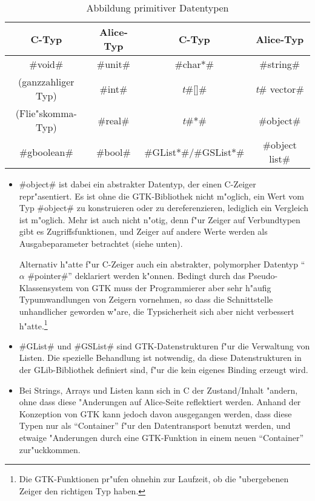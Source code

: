 \documentclass[a4paper,titlepage]{article}
\begin{document}
\begin{table}
\begin{center}
  \begin{tabular}{|c|c||c|c|}
  \hline \textbf{C-Typ}     & \textbf{Alice-Typ} &
         \textbf{C-Typ}     & \textbf{Alice-Typ}\\
  \hline #void#             & #unit# & #char*#            & #string#     \\
  \hline (ganzzahliger Typ) & #int#  & \emph{t}#[]#       & \emph{t}# vector#\\
  \hline (Flie"skomma-Typ)  & #real# & \emph{t}#*#        & #object# \\
  \hline #gboolean#         & #bool# & #GList*#/#GSList*# & #object list# \\
  \hline
  \end{tabular}
\end{center}
\caption{Abbildung primitiver Datentypen}
\label{PrimTab}
\end{table}

\begin{itemize}
\item
#object# ist dabei ein abstrakter Datentyp, der einen C-Zeiger repr"asentiert.
Es ist ohne die GTK-Bibliothek nicht m"oglich, ein Wert vom Typ #object# zu
konstruieren oder zu dereferenzieren, lediglich ein Vergleich ist m"oglich.
Mehr ist auch nicht n"otig, denn f"ur Zeiger auf Verbundtypen gibt es
Zugriffsfunktionen, und Zeiger auf andere Werte werden als Ausgabeparameter
betrachtet (siehe unten).

Alternativ h"atte f"ur C-Zeiger auch ein abstrakter, polymorpher Datentyp
``$\alpha$ #pointer#'' deklariert werden k"onnen. Bedingt durch das 
Pseudo-Klassensystem von GTK muss der Programmierer aber sehr h"aufig
Typumwandlungen von Zeigern vornehmen, so dass die Schnittstelle unhandlicher
geworden w"are, die Typsicherheit sich aber nicht verbessert 
h"atte.\footnote{Die
GTK-Funktionen pr"ufen ohnehin zur Laufzeit, ob die "ubergebenen
Zeiger den richtigen Typ haben.}

\item 
#GList# und #GSList# sind GTK-Datenstrukturen f"ur die Verwaltung von Listen.
Die spezielle Behandlung ist notwendig, da diese Datenstrukturen in der
GLib-Bibliothek definiert sind, f"ur die kein eigenes Binding erzeugt wird.

\item
Bei Strings, Arrays und Listen kann sich in C der Zustand/Inhalt "andern,
ohne dass diese "Anderungen auf Alice-Seite reflektiert werden. Anhand der
Konzeption von GTK kann jedoch davon ausgegangen werden, dass diese Typen
nur als ``Container'' f"ur den Datentransport benutzt werden, und etwaige
"Anderungen durch eine GTK-Funktion in einem neuen ``Container'' zur"uckkommen.
\end{itemize}
\end{document}
